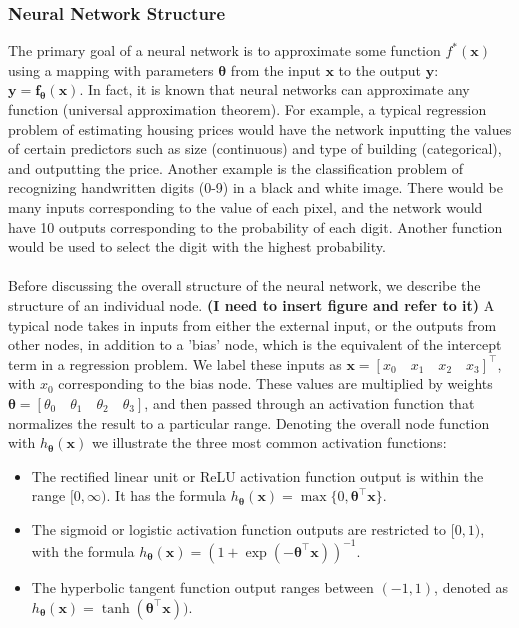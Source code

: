 \documentclass[a4paper,12pt]{article}
\begin{document}
\subsubsection{Neural Network Structure}
The primary goal of a neural network is to approximate some function $f^*(\textbf{x})$ using a mapping with parameters $\bm{\theta}$ from the input $\textbf{x}$ to the output $\textbf{y}$: $\textbf{y}=\textbf{f}_{\bm{\theta}}(\textbf{x})$. In fact, it is known that neural networks can approximate any function (universal approximation theorem). For example, a typical regression problem of estimating housing prices would have the network inputting the values of certain predictors such as size (continuous) and type of building (categorical), and outputting the price. Another example is the classification problem of recognizing handwritten digits (0-9) in a black and white image. There would be many inputs corresponding to the value of each pixel, and the network would have 10 outputs corresponding to the probability of each digit. Another function would be used to select the digit with the highest probability.\\
\\
Before discussing the overall structure of the neural network, we describe the structure of an individual node. \textbf{(I need to insert figure and refer to it) }A typical node takes in inputs from either the external input, or the outputs from other nodes, in addition to a 'bias' node, which is the equivalent of the intercept term in a regression problem. We label these inputs as $\textbf{x}=[x_0\quad x_1\quad x_2\quad x_3]^\top$, with $x_0$ corresponding to the bias node. These values are multiplied by weights $\bm{\theta}=[\theta_0\quad\theta_1\quad\theta_2\quad\theta_3]$, and then passed through an activation function that normalizes the result to a particular range. Denoting the overall node function with $h_{\bm{\theta}}(\textbf{x})$ we illustrate the three most common activation functions:
\begin{itemize}
\item The rectified linear unit or ReLU activation function output is within the range $[0,\infty)$. It has the formula $h_{\bm{\theta}}(\textbf{x})=\max\{0,\bm{\theta}^\top\textbf{x}\}$.
\item The sigmoid or logistic activation function outputs are restricted to $[0,1)$, with the formula $h_{\bm{\theta}}(\textbf{x})=(1+\exp(-\bm{\theta}^\top\textbf{x}))^{-1}$.
\item The hyperbolic tangent function output ranges between $(-1,1)$, denoted as $h_{\bm{\theta}}(\textbf{x})=\tanh(\bm{\theta}^\top\textbf{x}))$.
\end{itemize}
\end{document}
